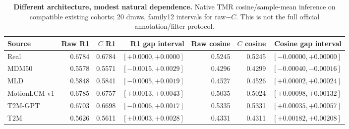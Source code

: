 \begin{table}[t]
\centering\footnotesize
\caption{\textbf{Different architecture, modest natural dependence.} Native TMR cosine/sample-mean inference on compatible existing cohorts; 20 draws, family12 intervals for raw$-C$. This is not the full official annotation/filter protocol.}\label{tab:tmrnatural}
\begin{tabular}{@{}lrrrrrr@{}}\toprule
Source&Raw R1&$C$ R1&R1 gap interval&Raw cosine&$C$ cosine&Cosine gap interval\\\midrule
Real&0.6784&0.6784&$[+0.0000,+0.0000]$&0.5245&0.5245&$[-0.00000,+0.00000]$\\
MDM50&0.5578&0.5571&$[-0.0015,+0.0029]$&0.4296&0.4299&$[-0.00040,-0.00016]$\\
MLD&0.5848&0.5841&$[-0.0005,+0.0019]$&0.4527&0.4526&$[+0.00002,+0.00024]$\\
MotionLCM-v1&0.6785&0.6757&$[+0.0013,+0.0043]$&0.5035&0.5024&$[+0.00098,+0.00132]$\\
T2M-GPT&0.6703&0.6698&$[-0.0006,+0.0017]$&0.5335&0.5331&$[+0.00035,+0.00057]$\\
T2M&0.5626&0.5611&$[+0.0003,+0.0028]$&0.4331&0.4311&$[+0.00182,+0.00208]$\\
\bottomrule\end{tabular}\end{table}
